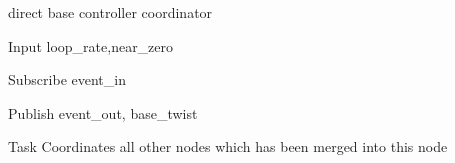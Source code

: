 \begin{frame}{direct base controller coordinator}
	\begin{alertblock}{Input}
	loop\_rate,near\_zero
    \end{alertblock}
    
    \begin{alertblock}{Subscribe}
	event\_in
    \end{alertblock}
    
    \begin{alertblock}{Publish}
	event\_out, base\_twist
    \end{alertblock}
    
    \begin{alertblock}{Task}
    Coordinates all other nodes which has been merged into this node
    \end{alertblock}
\end{frame}

